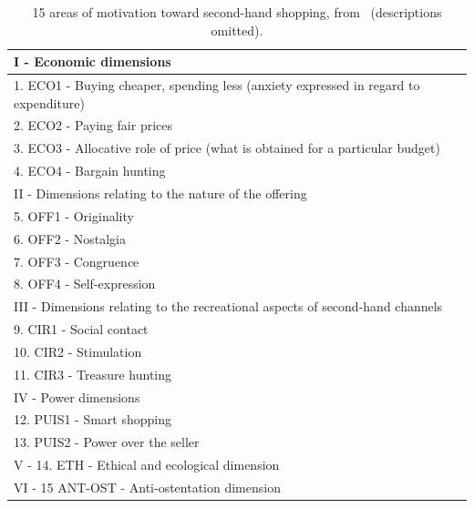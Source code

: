 \begin{table}[!]
	\begin{tabular}{p{}}
		\toprule
		I - Economic dimensions                                                              \\\midrule
		1. ECO1 - Buying cheaper, spending less (anxiety expressed in regard to expenditure) \\
		2. ECO2 - Paying fair prices                                                         \\
		3. ECO3 - Allocative role of price (what is obtained for a particular budget)        \\
		4. ECO4 - Bargain hunting                                                            \\
		\toprule
		II - Dimensions relating to the nature of the offering                               \\\midrule
		5. OFF1 - Originality                                                                \\
		6. OFF2 - Nostalgia                                                                  \\
		7. OFF3 - Congruence                                                                 \\
		8. OFF4 - Self-expression                                                            \\
		\toprule
		III - Dimensions relating to the recreational aspects of second-hand channels        \\\midrule
		9. CIR1 - Social contact                                                             \\
		10. CIR2 - Stimulation                                                               \\
		11. CIR3 - Treasure hunting                                                          \\
		\toprule
		IV - Power dimensions                                                                \\\midrule
		12. PUIS1 - Smart shopping                                                           \\
		13. PUIS2 - Power over the seller                                                    \\
		\toprule
		V - 14. ETH - Ethical and ecological dimension                                       \\
		\toprule
		VI - 15 ANT-OST - Anti-ostentation dimension                                         \\
		\bottomrule
	\end{tabular}\\
	\caption{15 areas of motivation toward second-hand shopping, from~\cite{SecondHandMotives} (descriptions omitted).}\label{tab:SecondHandMotives}
\end{table}

